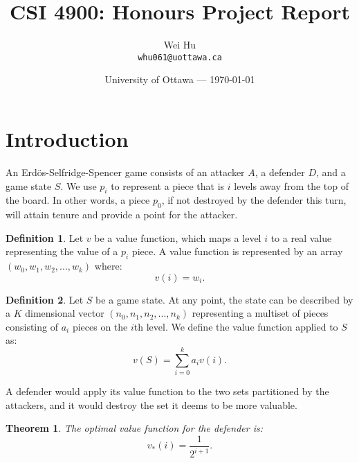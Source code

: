 \documentclass{article}
\title{CSI 4900: Honours Project Report} %
\author{Wei Hu\\ \texttt{whu061@uottawa.ca}} %
\date{University of Ottawa --- \today} %
\theoremstyle{plain}
\newtheorem{thm}{Theorem}[section]
\theoremstyle{definition}
\newtheorem{defn}{Definition}[section]
\theoremstyle{remark}
\begin{document}
\maketitle %


\section{Introduction} %

An Erd\"os-Selfridge-Spencer game consists of an attacker $A$, a defender $D$, and a game state $S$. We use $p_{i}$ to represent a piece that is $i$ levels away from the top of the board. In other words, a piece $p_{0}$, if not destroyed by the defender this turn, will attain tenure and provide a point for the attacker.

\begin{defn}
Let $v$ be a value function, which maps a level $i$ to a real value representing the value of a $p_{i}$ piece. A value function is represented by an array $(w_{0}, w_{1}, w_{2}, ... , w_{k})$ where:
\begin{equation*}
		v(i) = w_{i}.
\end{equation*}
\end{defn}

\begin{defn}
Let $S$ be a game state. At any point, the state can be described by a $K$ dimensional vector $(n_{0}, n_{1}, n_{2}, ... , n_{k})$ representing a multiset of pieces consisting of $a_{i}$ pieces on the $i$th level. We define the value function applied to $S$ as:
\begin{equation*}
	v(S) = \sum_{i = 0}^k a_{i}v(i).
\end{equation*}
\end{defn}

A defender would apply its value function to the two sets partitioned by the attackers, and it would destroy the set it deems to be more valuable.

\begin{thm}
The optimal value function for the defender is:
\begin{equation}
	v_{*}(i) = \frac{1}{2^{i+1}}.
\end{equation}
\end{thm}
\end{document}
